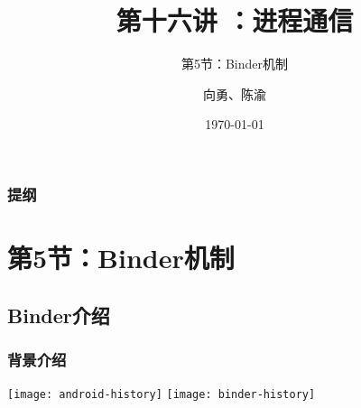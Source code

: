 


\title[第16讲]{第十六讲 ：进程通信} %
\subtitle{第5节：Binder机制}
\author{向勇、陈渝} %
\date{\today} %



\begin{frame}
\titlepage %
\end{frame}

\begin{frame}
\frametitle{提纲} %
\tableofcontents %

\end{frame}
\section{第5节：Binder机制} %
\subsection{Binder介绍} %
\begin{frame}[plain]
	\frametitle{背景介绍}
	\centering
	\texttt{[image: android-history]}
	\texttt{[image: binder-history]}
\end{frame}

